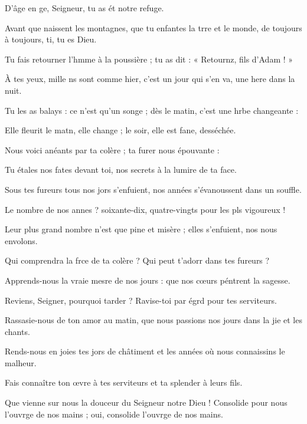 \item D’âge en ge, Seigneur,\psstar{} tu as ét notre refuge.
\item Avant que naissent les montagnes,\pscross{} que tu enfantes la trre et le monde,\psstar{} de toujours à toujours, ti, tu es Dieu.
\item Tu fais retourner l’hmme à la poussière ;\psstar{} tu as dit : « Retournz, fils d’Adam ! »
\item À tes yeux, mille ns sont comme hier,\psstar{} c’est un jour qui s’en va, une here dans la nuit.
\item Tu les as balays : ce n’est qu’un songe ;\psstar{} dès le matin, c’est une hrbe changeante :
\item Elle fleurit le matn, elle change ;\psstar{} le soir, elle est fane, desséchée.
\item Nous voici anéants par ta colère ;\psstar{} ta furer nous épouvante :
\item Tu étales nos fates devant toi,\psstar{} nos secrets à la lumire de ta face.
\item Sous tes fureurs tous nos jors s’enfuient,\psstar{} nos années s’évanoussent dans un souffle.
\item Le nombre de nos annes ? soixante-dix,\psstar{} quatre-vingts pour les pls vigoureux !
\item Leur plus grand nombre n’est que pine et misère ;\psstar{} elles s’enfuient, nos nous envolons.
\item Qui comprendra la frce de ta colère ?\psstar{} Qui peut t’adorr dans tes fureurs ?
\item Apprends-nous la vraie mesre de nos jours :\psstar{} que nos cœurs péntrent la sagesse.
\item Reviens, Seigner, pourquoi tarder ?\psstar{} Ravise-toi par égrd pour tes serviteurs.
\item Rassasie-nous de ton amor au matin,\psstar{} que nous passions nos jours dans la jie et les chants.
\item Rends-nous en joies tes jors de châtiment\psstar{} et les années où nous connaissins le malheur.
\item Fais connaître ton œvre à tes serviteurs\psstar{} et ta splender à leurs fils.
\item Que vienne sur nous la douceur du Seigneur notre Dieu !\pscross{} Consolide pour nous l’ouvrge de nos mains ;\psstar{} oui, consolide l’ouvrge de nos mains.